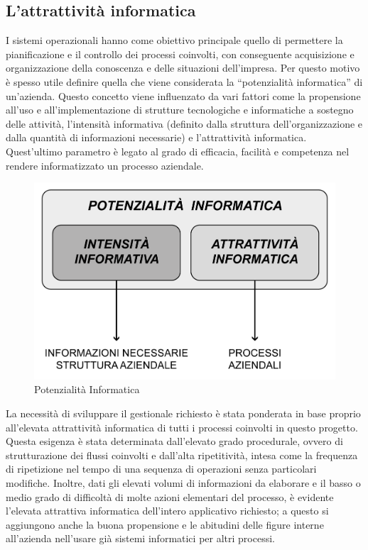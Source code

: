 \subsection{L'attrattività informatica}
\label{sec:attrattivita}
I sistemi operazionali hanno come obiettivo principale quello di permettere la pianificazione e il controllo dei processi coinvolti, con conseguente acquisizione e organizzazione della conoscenza e delle situazioni dell'impresa. Per questo motivo è spesso utile definire quella che viene considerata la ``potenzialità informatica'' di un'azienda. Questo concetto viene influenzato da vari fattori come la propensione all'uso e all'implementazione di strutture tecnologiche e informatiche a sostegno delle attività, l'intensità informativa (definito dalla struttura dell'organizzazione e dalla quantità di informazioni necessarie) e l'attrattività informatica.
Quest'ultimo parametro è legato al grado di efficacia, facilità e competenza nel rendere informatizzato un processo aziendale.\\
\begin{figure}[!hbt]
\centering
\includegraphics[scale=0.55]{img/potenzialita.png}
\caption{Potenzialità Informatica}
\label{fig:potenzialita}
\end{figure}
\noindent
\newline
La necessità di sviluppare il gestionale richiesto è stata ponderata in base proprio all'elevata attrattività informatica di tutti i processi coinvolti in questo progetto. Questa esigenza è stata determinata dall'elevato grado procedurale, ovvero di strutturazione dei flussi coinvolti e dall'alta ripetitività, intesa come la frequenza di ripetizione nel tempo di una sequenza di operazioni senza particolari modifiche. Inoltre, dati gli elevati volumi di informazioni da elaborare e il basso o medio grado di difficoltà di molte azioni elementari del processo, è evidente l'elevata attrattiva informatica dell'intero applicativo richiesto; a questo si aggiungono anche la buona propensione e le abitudini delle figure interne all'azienda nell'usare già sistemi informatici per altri processi.      
